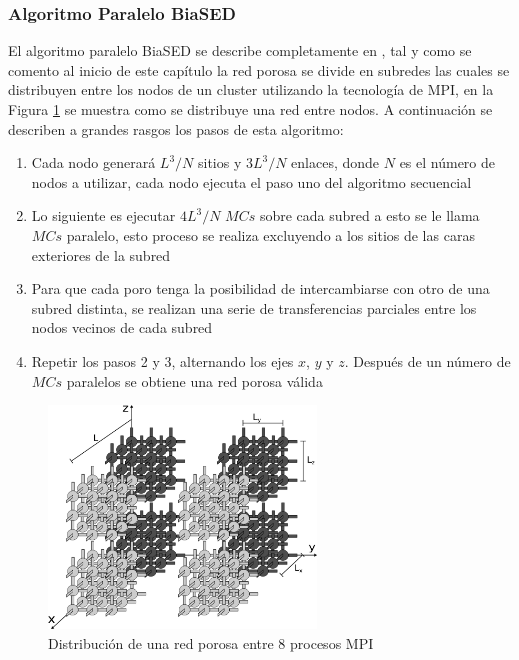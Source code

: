 \subsubsection{Algoritmo Paralelo BiaSED}
\label{subsubsec:pbiased}
El algoritmo paralelo BiaSED se describe completamente en \cite{ref4}, tal y como se comento al inicio de este capítulo la red porosa se divide en subredes las cuales se distribuyen entre los nodos de un cluster utilizando la tecnología de MPI, en la Figura \ref{fig:distribucion_rw} se muestra como se distribuye una red entre nodos. A continuación se describen a grandes rasgos los pasos de esta algoritmo:

\begin{enumerate}
\item Cada nodo generará $L^3/N$ sitios y $3L^3/N$ enlaces, donde $N$ es el número de nodos a utilizar, cada nodo ejecuta el paso uno del algoritmo secuencial

\item Lo siguiente es ejecutar $4L^3/N$ $MCs$ sobre cada subred a esto se le llama $MCs$ paralelo, esto proceso se realiza excluyendo a los sitios de las caras exteriores de la subred

\item Para que cada poro tenga la posibilidad de intercambiarse con otro de una subred distinta, se realizan una serie de transferencias parciales entre los nodos vecinos de cada subred

\item Repetir los pasos 2 y 3, alternando los ejes $x$, $y$ y $z$. Después de un número de $MCs$ paralelos se obtiene una red porosa válida
\end{enumerate}

\begin{figure}[hbtp]
\centering
\includegraphics[width=2.8in]{img/distribucion}
\caption{Distribución de una red porosa entre 8 procesos MPI}
\label{fig:distribucion_rw}
\end{figure}


